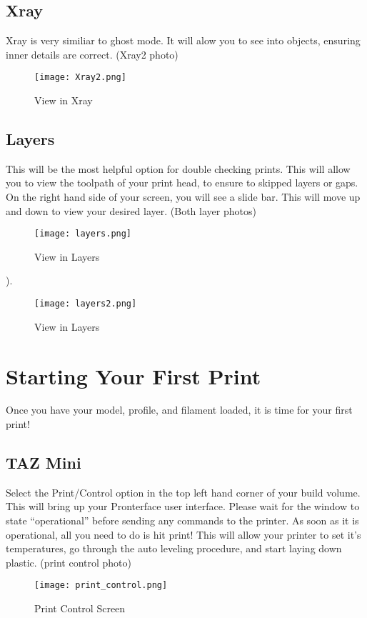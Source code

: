 \subsection{Xray}

Xray is very similiar to ghost mode. It will alow you to see into objects, ensuring inner details are correct. (Xray2 photo)
\begin{figure}[hbt]
\centering
\texttt{[image: Xray2.png]}
\caption{View in Xray}
\label{fig:Xray View}
\end{figure}

\subsection{Layers}

This will be the most helpful option for double checking prints. This will allow you to view the toolpath of your print head, to ensure to skipped layers or gaps. On the right hand side of your screen, you will see a slide bar. This will move up and down to view your desired layer. (Both layer photos)
\begin{figure}[hbt]
\centering
\texttt{[image: layers.png]}
\caption{View in Layers}
\label{fig:Layers View}
\end{figure}
\pageref{fig:Mid Layers}).
\begin{figure}[hbt]
\centering
\texttt{[image: layers2.png]}
\caption{View in Layers}
\label{fig:Mid Layers View}
\end{figure}

\section{Starting Your First Print}

Once you have your model, profile, and filament loaded, it is time for your first print! 

\subsection{TAZ Mini}

Select the Print/Control option in the top left hand corner of your build volume. This will bring up your Pronterface user interface. Please wait for the window to state “operational” before sending any commands to the printer. As soon as it is operational, all you need to do is hit print! This will allow your printer to set it's temperatures, go through the auto leveling procedure, and start laying down plastic. (print control photo)
\begin{figure}[hbt]
\centering
\texttt{[image: print\_control.png]}
\caption{Print Control Screen}
\label{fig:Print Control}
\end{figure}

